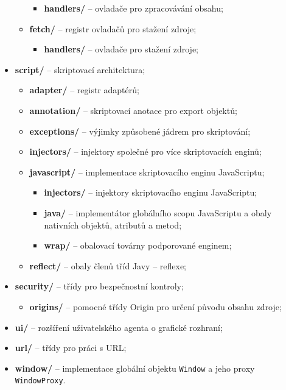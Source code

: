 \begin{itemize}
\begin{itemize}
         \begin{itemize}
           \item[] \textbf{handlers/} -- ovladače pro zpracovávání obsahu;
         \end{itemize}
       \item[] \textbf{fetch/} -- registr ovladačů pro stažení zdroje;
         \begin{itemize}
           \item[] \textbf{handlers/} -- ovladače pro stažení zdroje;
         \end{itemize}
     \end{itemize}
  \item \textbf{script/} -- skriptovací architektura;
     \begin{itemize}
       \item[] \textbf{adapter/} -- registr adaptérů;
       \item[] \textbf{annotation/} -- skriptovací anotace pro export objektů;
       \item[] \textbf{exceptions/} -- výjimky způsobené jádrem pro skriptování;
       \item[] \textbf{injectors/} -- injektory společné pro více skriptovacích enginů;
       \item[] \textbf{javascript/} -- implementace skriptovacího enginu JavaScriptu;
         \begin{itemize}
           \item[] \textbf{injectors/} -- injektory skriptovacího enginu JavaScriptu;
           \item[] \textbf{java/} -- implementátor globálního scopu JavaScriptu a obaly nativních objektů, atributů a metod;
           \item[] \textbf{wrap/} -- obalovací továrny podporované enginem;
         \end{itemize}
       \item[] \textbf{reflect/} -- obaly členů tříd Javy -- reflexe;
     \end{itemize}
  \item \textbf{security/} -- třídy pro bezpečnostní kontroly;
     \begin{itemize}
       \item[] \textbf{origins/} -- pomocné třídy Origin pro určení původu obsahu zdroje;
     \end{itemize}
  \item \textbf{ui/} -- rozšíření uživatelského agenta o grafické rozhraní;
  \item \textbf{url/} -- třídy pro práci s URL;
  \item \textbf{window/} -- implementace globální objektu \texttt{Window} a jeho proxy \texttt{WindowProxy}.
\end{itemize} 



